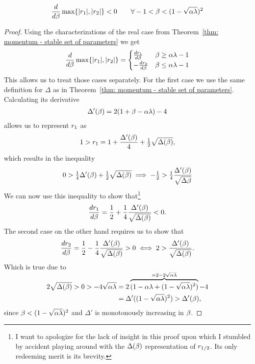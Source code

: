 \begin{lemma}\label{lem-appdx: just at the border of complex case is best beta}
	\begin{align*}
		\frac{d}{d\beta}\max\{|r_1|,|r_2|\} < 0 \qquad
		\forall -1<\beta <(1-\sqrt{\alpha\lambda})^2
	\end{align*}
\end{lemma}
\begin{proof}
	Using the characterizations of the real case
	from Theorem~\ref{thm: momentum - stable set of parameters} we get
	\begin{align*}
		\frac{d}{d\beta}\max\{|r_1|,|r_2|\}
		= \begin{cases}
			\frac{dr_1}{d\beta} & \beta \ge \alpha\lambda -1 \\
			-\frac{dr_2}{d\beta} & \beta \le \alpha\lambda -1 
		\end{cases}
	\end{align*}
	This allows us to treat those cases separately. For the first case we use
	the same definition for \(\Delta\) as in Theorem~\ref{thm: momentum - stable
	set of parameters}. Calculating its derivative
	\begin{align*}
		\Delta'(\beta) = 2(1+\beta-\alpha\lambda)	-4
	\end{align*}
	allows us to represent \(r_1\) as
	\begin{align*}
		1>r_1
		= 1 + \frac{\Delta'(\beta)}{4} + \tfrac12 \sqrt{\Delta(\beta)},
	\end{align*}
	which results in the inequality
	\begin{align*}
		0 > \tfrac14\Delta'(\beta) + \tfrac12\sqrt{\Delta(\beta)}
		\implies -\tfrac12 > \tfrac14\frac{\Delta'(\beta)}{\sqrt{\Delta{\beta}}}
	\end{align*}
	We can now use this inequality to show that\footnote{
		I want to apologize for the lack of insight in this proof upon which I
		stumbled by accident playing around with the \(\Delta(\beta)\)
		representation of \(r_{1/2}\). Its only redeeming merit is its brevity.
	}
	\begin{align*}
		\frac{dr_1}{d\beta}
		= \frac12 + \frac14 \frac{\Delta'(\beta)}{\sqrt{\Delta(\beta)}} < 0.
	\end{align*}
	The second case on the other hand requires us to show that
	\begin{align*}
		\frac{dr_2}{d\beta}
		= \frac12 - \frac14 \frac{\Delta'(\beta)}{\sqrt{\Delta(\beta)}} > 0
		\iff 2 > \frac{\Delta'(\beta)}{\sqrt{\Delta(\beta)}}.
	\end{align*}
	Which is true due to
	\begin{align*}
		2\sqrt{\Delta(\beta)} > 0 > -4\sqrt{\alpha\lambda}
		&= 2\overbrace{
			(1-\alpha\lambda + (1-\sqrt{\alpha\lambda})^2)
		}^{\smash{=2-2\sqrt{\alpha\lambda}}} -4\\
		&= \Delta'((1-\sqrt{\alpha\lambda})^2) > \Delta'(\beta),
	\end{align*}
	since \(\beta<(1-\sqrt{\alpha\lambda})^2\) and \(\Delta'\) is monotonously
	increasing in \(\beta\).
\end{proof}

